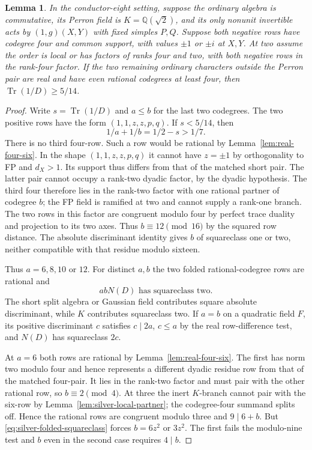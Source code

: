 \documentclass[11pt,reqno]{amsart}
\newtheorem{lemma}[theorem]{Lemma}
\theoremstyle{remark}\newtheorem{remark}[theorem]{Remark}
\numberwithin{equation}{section}
\begin{document}
\begin{lemma}\label{lem:silver-common-ordinary-mass}
In the conductor-eight setting, suppose the ordinary algebra is
commutative, its Perron field is
$K=\mathbb Q(\sqrt2)$, and its only nonunit invertible acts by
$(1,g)(X,Y)$ with fixed simples $P,Q$. Suppose both negative rows
have codegree four and common support, with values $\pm1$ or $\pm i$
at $X,Y$. At two assume the order is local or has factors of ranks
four and two, with both negative rows in the rank-four factor. If the
two remaining ordinary characters outside the Perron pair are real and
have even rational codegrees at least four, then
$\operatorname{Tr}(1/D)\ge5/14$.
\end{lemma}
\begin{proof}
Write $s=\operatorname{Tr}(1/D)$ and $a\le b$ for the last two codegrees.
The two positive rows have the form $(1,1,z,z,p,q)$. If $s<5/14$, then
\begin{equation}\label{eq:silver-ordinary-final-denoms}
       1/a+1/b=1/2-s>1/7.
\end{equation}
There is no third four-row. Such a row would be rational by Lemma~\ref{lem:real-four-six}. In the shape $(1,1,z,z,p,q)$ it cannot have $z=\pm1$ by orthogonality to FP and $d_X>1$. Its support thus differs from that of the matched short pair. The latter pair cannot occupy a rank-two dyadic factor, by the dyadic hypothesis. The third four therefore lies in the rank-two factor with one rational partner of codegree $b$; the FP field is ramified at two and cannot supply a rank-one branch. The two rows in this factor are congruent modulo four by perfect trace duality and projection to its two axes. Thus $b\equiv12\pmod{16}$ by the squared row distance. The absolute discriminant identity gives $b$ of squareclass one or two, neither compatible with that residue modulo sixteen.

Thus $a=6,8,10$ or $12$. For distinct $a,b$ the two folded rational-codegree rows are rational and
\begin{equation}\label{eq:silver-folded-squareclass}
 abN(D)\text{ has squareclass two}.
\end{equation}
The short split algebra or Gaussian field contributes square absolute discriminant, while $K$ contributes squareclass two. If $a=b$ on a quadratic field $F$, its positive discriminant $c$ satisfies $c\mid2a$, $c\le a$ by the real row-difference test, and $N(D)$ has squareclass $2c$.

At $a=6$ both rows are rational by Lemma~\ref{lem:real-four-six}. The first has norm two modulo four and hence represents a different dyadic residue row from that of the matched four-pair. It lies in the rank-two factor and must pair with the other rational row, so $b\equiv2\pmod4$. At three the inert $K$-branch cannot pair with the six-row by Lemma~\ref{lem:silver-local-partner}; the codegree-four summand splits off. Hence the rational rows are congruent modulo three and $9\mid6+b$. But \eqref{eq:silver-folded-squareclass} forces $b=6z^2$ or $3z^2$. The first fails the modulo-nine test and $b$ even in the second case requires $4\mid b$.


\end{proof}
\end{document}
